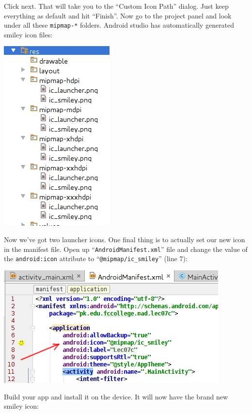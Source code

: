 Click next. That will take you to the ``Custom Icon Path'' dialog. Just keep everything as default and hit ``Finish''. Now go to the project panel and look under all these \texttt{mipmap-*} folders. Android studio has automatically generated smiley icon files:

\begin{center}
	\includegraphics[scale=0.4]{chapters/ch06/images/24}
\end{center}

Now we've got two launcher icons. One final thing is to actually set our new icon in the manifest file. Open up ``\texttt{AndroidManifest.xml}'' file and change the value of the \texttt{android:icon} attribute to ``\texttt{@mipmap/ic\_smiley}'' (line 7):

\begin{center}
	\includegraphics[scale=0.4]{chapters/ch06/images/25}
\end{center}

Build your app and install it on the device. It will now have the brand new smiley icon:


